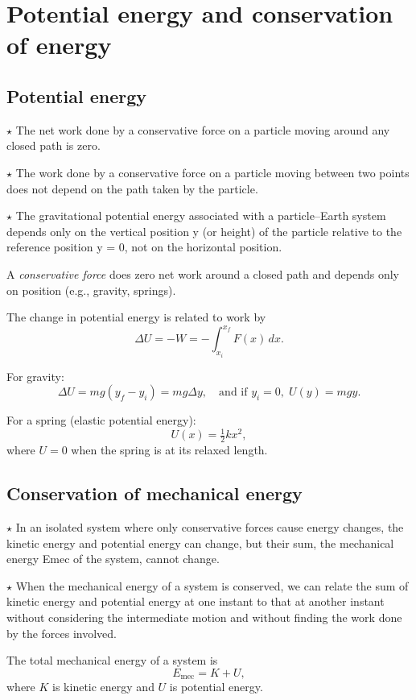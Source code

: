 \section{Potential energy and conservation of energy}
\subsection{Potential energy}
\noindent $\star$ The net work done by a conservative force on a particle moving around any closed path is zero.

\noindent $\star$ The work done by a conservative force on a particle moving between two points does not depend on the path taken by the particle.

\noindent $\star$ The gravitational potential energy associated with a particle–Earth system depends only on the vertical position y (or height) of the particle relative to the reference position y = 0, not on the horizontal position.

A \textit{conservative force} does zero net work around a closed path and depends only on position (e.g., gravity, springs).

The change in potential energy is related to work by
\[
\Delta U = -W = -\int_{x_i}^{x_f} F(x)\,dx.
\]

For gravity:
\[
\Delta U = mg(y_f - y_i) = mg\Delta y, \quad \text{and if } y_i = 0, \; U(y) = mgy.
\]

For a spring (elastic potential energy):
\[
U(x) = \tfrac{1}{2}kx^2,
\]
where \( U = 0 \) when the spring is at its relaxed length.

\subsection{Conservation of mechanical energy}
\noindent $\star$ In an isolated system where only conservative forces cause energy changes, the
kinetic energy and potential energy can change, but their sum, the mechanical energy Emec of the system, cannot change.

\noindent $\star$ When the mechanical energy of a system is conserved, we can relate the sum of kinetic energy and potential energy at one instant to that at another instant without considering the intermediate motion and without finding the work done by the forces involved.


The total mechanical energy of a system is
\[
E_{\text{mec}} = K + U,
\]
where \(K\) is kinetic energy and \(U\) is potential energy.

